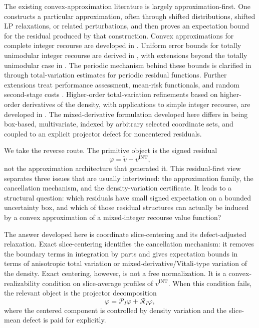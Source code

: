 \documentclass[11pt,letterpaper]{article}
\theoremstyle{definition}
\theoremstyle{remark}
\newcommand{\INT}{\mathrm{INT}}
\begin{document}
The existing convex-approximation literature is largely
approximation-first. One constructs a particular approximation, often through
shifted distributions, shifted LP relaxations, or related perturbations, and
then proves an expectation bound for the residual produced by that
construction. Convex approximations for complete integer recourse are developed
in \cite{vlerkthesis,VanderVlerk2004}. Uniform error bounds for totally
unimodular integer recourse are derived in \cite{ward2015}, with extensions
beyond the totally unimodular case in \cite{ward2015bb}. The periodic
mechanism behind these bounds is clarified in \cite{total1} through
total-variation estimates for periodic residual functions. Further extensions
treat performance assessment, mean-risk functionals, and random second-stage costs
\cite{ward_assessing,vanBeestenRomeijnders2020,vanBeestenRomeijnders2022}. Higher-order total-variation refinements based on higher-order
derivatives of the density, with applications to simple integer recourse,
are developed in \cite{vanDerLaanEtAl2018HigherOrder}. The mixed-derivative formulation developed here differs in being box-based,
multivariate, indexed by arbitrary selected coordinate sets, and coupled
to an explicit projector defect for noncentered residuals.


We take the reverse route. The primitive object is the signed residual
$$
\varphi=\widetilde v-v^{\INT},
$$
not the approximation architecture that generated it. This residual-first view
separates three issues that are usually intertwined: the approximation family,
the cancellation mechanism, and the density-variation certificate. It leads to
a structural question: which residuals have small signed expectation on a
bounded uncertainty box, and which of those residual structures can actually be
induced by a convex approximation of a mixed-integer recourse value function?

The answer developed here is coordinate slice-centering and its
defect-adjusted relaxation. Exact slice-centering identifies the cancellation
mechanism: it removes the boundary terms in integration by parts and gives
expectation bounds in terms of anisotropic total variation or
mixed-derivative/Vitali-type variation of the density. Exact centering,
however, is not a free normalization. It is a convex-realizability condition on
slice-average profiles of $v^{\INT}$. When this condition fails, the relevant
object is the projector decomposition
$$
\varphi=\mathcal P_I\varphi+\mathcal R_I\varphi,
$$
where the centered component is controlled by density variation and the
slice-mean defect is paid for explicitly.
\end{document}
